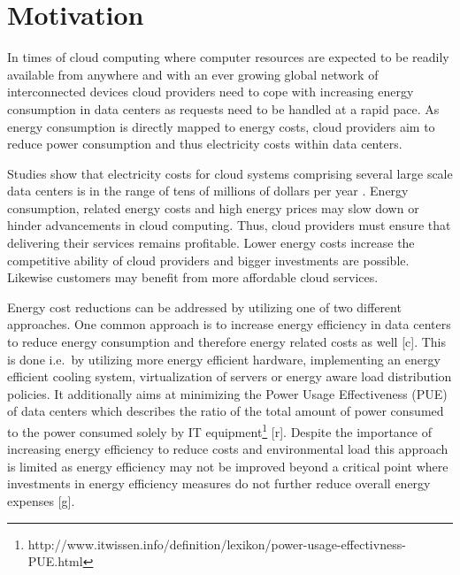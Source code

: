 

\section{Motivation}

In times of cloud computing where computer resources are expected to be readily available from anywhere \cite{buyya2009cloud} and with an ever growing global network of interconnected devices cloud providers need to cope with increasing energy consumption in data centers as requests need to be handled at a rapid pace. 
As energy consumption is directly mapped to energy costs, cloud providers aim to reduce power consumption and thus electricity costs within data centers. 

Studies show that electricity costs for cloud systems comprising several large scale data centers is in the range of tens of millions of dollars per year \cite{qureshi2009cutting}. Energy consumption, related energy costs and high energy prices may slow down or hinder advancements in cloud computing. Thus, cloud providers must ensure that delivering their services remains profitable. Lower energy costs increase the competitive ability of cloud providers and bigger investments are possible. Likewise customers may benefit from more affordable cloud services. 

Energy cost reductions can be addressed by utilizing one of two different approaches. One common approach is to increase energy efficiency in data centers to reduce energy consumption and therefore energy related costs as well [c]. This is done i.e.~by utilizing more energy efficient hardware, implementing an energy efficient cooling system, virtualization of servers or energy aware load distribution policies. It additionally aims at minimizing the Power Usage Effectiveness (PUE) of data centers which describes the ratio of the total amount of power consumed to the power consumed solely by IT equipment\footnote{http://www.itwissen.info/definition/lexikon/power-usage-effectivness-PUE.html} [r]. Despite the importance of increasing energy efficiency to reduce costs and environmental load this approach is limited as energy efficiency may not be improved beyond a critical point where investments in energy efficiency measures do not further reduce overall energy expenses [g]. 

